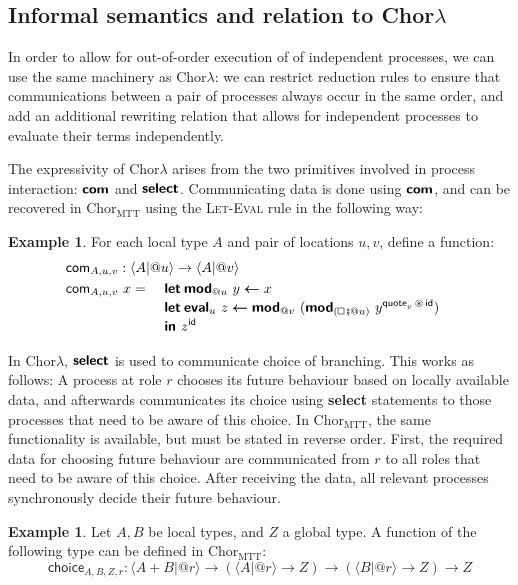 \documentclass{scrartcl}
\renewcommand{\square}{\mathop{\mathchoice%
  {\tikz{\draw (0,0) rectangle (0.2cm,0.2cm);}}%
  {\tikz{\draw (0,0) rectangle (0.2cm,0.2cm);}}%
  {\tikz{\draw (0,0) rectangle (0.15cm,0.15cm);}}%
  {\tikz{\draw (0,0) rectangle (0.10cm,0.10cm);}}}}
\theoremstyle{definition}
\newtheorem{example}[definition]{Example}
\theoremstyle{plain}
\newcommand{\primitive}[1]{\textsf{\textbf{#1}}}
\newcommand{\ChorMTT}{Chor${}_{\textrm{MTT}}$}
\begin{document}

\subsection{Informal semantics and relation to
  \texorpdfstring{Chor$\lambda$}{ChorLambda}}
In order to allow for out-of-order execution of of independent processes, we
can use the same machinery as Chor$\lambda$: we can restrict reduction rules to
ensure that communications between a pair of processes always occur in the same
order, and add an additional rewriting relation that allows for independent
processes to evaluate their terms independently.

The expressivity of Chor$\lambda$ arises from the two primitives involved in
process interaction: $\primitive{com}$ and $\primitive{select}$. Communicating
data is done using $\primitive{com}$, and can be recovered in \ChorMTT{} using
the \textsc{Let-Eval} rule in the following way:
\begin{example}
  For each local type $A$ and pair of locations $u,v$, define a function:
  \begin{alignat*}{3}
    & \rlap{$\textsf{com}_{A,u,v} :
        \langle A | @u \rangle \to \langle A | @v \rangle$}\\
    & \textsf{com}_{A,u,v}\ x =
      \ && \primitive{let}\:\primitive{mod}_{@u}\ y \bm{\leftarrow} x\\[-3pt]
    &   && \primitive{let}\:\primitive{eval}_u\ z \bm{\leftarrow}
             \primitive{mod}_{@v}\ (\primitive{mod}_{(\square \fatsemi @u)}
             \ y^{\textsf{quote}_v \,\circledast\, \textsf{id}})\\[-3pt]
    &   && \primitive{in } z^{\textsf{id}}
  \end{alignat*}
\end{example}
In Chor$\lambda$, $\primitive{select}$ is used to communicate choice of
branching. This works as follows: A process at role $r$ chooses its future
behaviour based on locally available data, and afterwards communicates its
choice using \primitive{select} statements to those processes that need to be
aware of this choice. In \ChorMTT{}, the same functionality is available, but
must be stated in reverse order. First, the required data for choosing future
behaviour are communicated from $r$ to all roles that need to be aware of this
choice. After receiving the data, all relevant processes synchronously decide
their future behaviour.
\begin{example}
  Let $A, B$ be local types, and $Z$ a global type. A function of the following
  type can be defined in \ChorMTT:
  \[
    \textsf{choice}_{A,B,Z,r} : \langle A + B | @r \rangle
    \to (\langle A | @r \rangle \to Z)
    \to (\langle B | @r \rangle \to Z)
    \to Z
  \]
\end{example}
\end{document}
